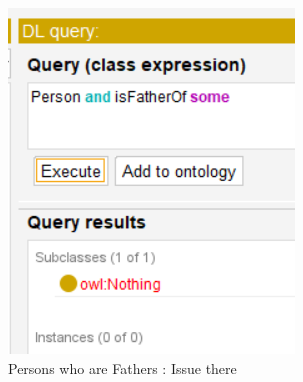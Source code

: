 \begin{figure}[h!]
\begin{minipage}[b]{0.3\textwidth}
        \includegraphics[width=\textwidth]{images/1.1 - tuto/q3.png}
        \caption{Persons who are Fathers : Issue there}
        \label{fig:image3}
    \end{minipage}
    
    \vspace{0.5cm} %
    

\end{figure}

